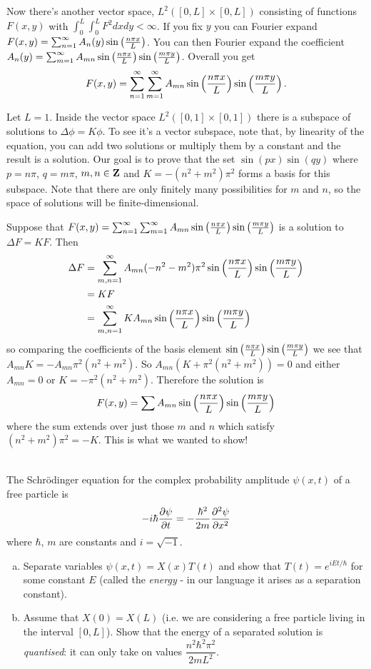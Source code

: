 \documentclass[12pt]{article}
\begin{document}
\begin{answer}
{Now there's another vector space, $L^2([0,L]\times [0,L])$ consisting of functions $F(x,y)$ with $\int_0^L\int_0^LF^2dxdy<\infty$. If you fix $y$ you can Fourier expand $F(x,y)=\sum_{n=1}^{\infty}A_n(y)\sin\left(\frac{n \pi x}{L}\right)$. You can then Fourier expand the coefficient $A_n(y)=\sum_{m=1}^{\infty}A_{mn}\sin\left(\frac{n \pi x}{L}\right)\sin\left(\frac{m\pi y}{L}\right)$. Overall you get
\[F(x,y)=\sum_{n=1}^{\infty}\sum_{m=1}^{\infty}A_{mn}\sin\left(\frac{n \pi x}{L}\right)\sin\left(\frac{m\pi y}{L}\right).\]

Let $L=1$. Inside the vector space $L^2([0,1]\times [0,1])$ there is a subspace of solutions to $\Delta\phi=K\phi$. To see it's a vector subspace, note that, by linearity of the equation, you can add two solutions or multiply them by a constant and the result is a solution. Our goal is to prove that the set $\sin(px)\sin(qy)$ where $p=n\pi$, $q=m\pi$, $m,n\in\mathbf{Z}$ and $K=-(n^2+m^2)\pi^2$ forms a basis for this subspace. Note that there are only finitely many possibilities for $m$ and $n$, so the space of solutions will be finite-dimensional.

Suppose that $F(x,y)=\sum_{n=1}^{\infty}\sum_{m=1}^{\infty}A_{mn}\sin\left(\frac{n \pi x}{L}\right)\sin\left(\frac{m\pi y}{L}\right)$ is a solution to $\Delta F=KF$. Then
\begin{align*}
\Delta F&=\sum_{m,n=1}^{\infty}A_{mn}(-n^2-m^2)\pi^2\sin\left(\frac{n \pi x}{L}\right)\sin\left(\frac{m\pi y}{L}\right)\\
        &=KF\\
        &=\sum_{m,n=1}^{\infty}KA_{mn}\sin\left(\frac{n \pi x}{L}\right)\sin\left(\frac{m\pi y}{L}\right)
\end{align*}
so comparing the coefficients of the basis element $\sin\left(\frac{n \pi x}{L}\right)\sin\left(\frac{m\pi y}{L}\right)$ we see that $A_{mn}K=-A_{mn}\pi^2(n^2+m^2)$. So $A_{mn}(K+\pi^2(n^2+m^2))=0$ and either $A_{mn}=0$ or $K=-\pi^2(n^2+m^2)$. Therefore the solution is
\[F(x,y)=\sum A_{mn}\sin\left(\frac{n \pi x}{L}\right)\sin\left(\frac{m\pi y}{L}\right)\]
where the sum extends over just those $m$ and $n$ which satisfy $(n^2+m^2)\pi^2=-K$. This is what we wanted to show!
}
\end{answer}
\newpage

\vspace{0.5cm}

\begin{question}\ \\
The Schr\"{o}dinger equation for the complex probability amplitude $\psi(x,t)$ of a free particle is
\[-i\hbar\dfrac{\partial \psi}{\partial t}=-\frac{\hbar^2}{2m}\dfrac{\partial^2 \psi}{\partial x^2}\]
where $\hbar$, $m$ are constants and $i=\sqrt{-1}$.

\begin{enumerate}[(a)]
\item Separate variables $\psi(x,t)=X(x)T(t)$ and show that $T(t)=e^{iEt/\hbar}$ for some constant $E$ (called the {\em energy} - in our language it arises as a separation constant).
\item Assume that $X(0)=X(L)$ (i.e. we are considering a free particle living in the interval $[0,L]$). Show that the energy of a separated solution is {\em quantised}: it can only take on values $\dfrac{n^2\hbar^2\pi^2}{2mL^2}$.
\end{enumerate}
\end{question}
\end{document}
